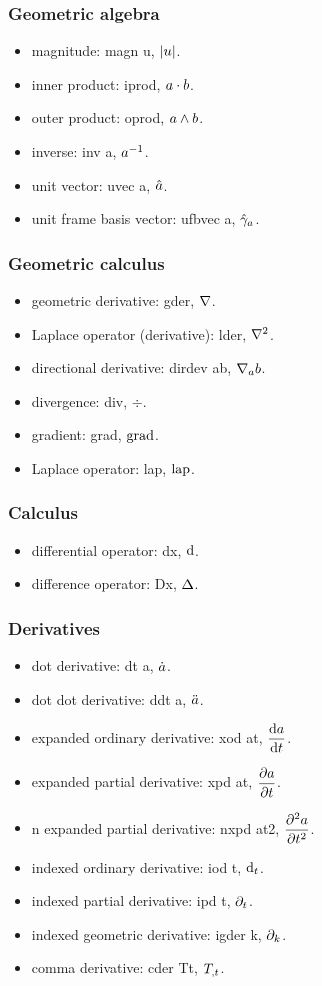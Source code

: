 \subsubsection{Geometric algebra}
\begin{itemize}
\item magnitude: magn u, $\vert{u}\vert$.
\item inner product: iprod, $a\cdot b$.
\item outer product: oprod, $a\wedge b$.
\item inverse: inv a, ${a}^{-1}$.
\item unit vector: uvec a, $\hat{a}$.
\item unit frame basis vector: ufbvec a, $\hat{\gamma}_{a}$.
\end{itemize}


\subsubsection{Geometric calculus}
\begin{itemize}
\item geometric derivative: gder, $\nabla$.
\item Laplace operator (derivative): lder, $\nabla^2$.
\item directional derivative: dirdev ab, $\nabla_{a}{b}$.
\item divergence: div, $\div$.
\item gradient: grad, $\operatorname{grad}$.
\item Laplace operator: lap, $\operatorname{lap}$.
\end{itemize}


\subsubsection{Calculus}
\begin{itemize}
\item differential operator: dx, $\text{d}$.
\item difference operator: Dx, $\Delta$.
\end{itemize}


\subsubsection{Derivatives}
\begin{itemize}
\item dot derivative: dt a, $\dot{a}$.
\item dot dot derivative: ddt a, $\ddot{a}$.
\item expanded ordinary derivative: xod at, $\dfrac{\text{d}{a}}{\text{d}{t}}$.
\item expanded partial derivative: xpd at, $\dfrac{\partial{a}}{\partial{t}}$.
\item n expanded partial derivative: nxpd at2, $\dfrac{\partial^{2}{a}}{\partial{t}^{2}}$.
\item indexed ordinary derivative: iod t, $\text{d}_{t}$.
\item indexed partial derivative: ipd t, $\partial_{t}$.
\item indexed geometric derivative: igder k, $\partial_{k}$.
\item comma derivative: cder Tt, ${T}_{,t}$.
\end{itemize}



